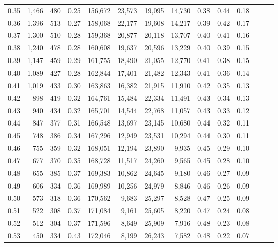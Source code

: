 \begin{tabular}{rrrrrrrrrrrrrr}
0.35 &  1,466 &  480 &  0.25 &  156,672 &   23,573 &  19,095 &  14,730 &  0.38 &  0.44 &      0.18 \\
0.36 &  1,396 &  513 &  0.27 &  158,068 &   22,177 &  19,608 &  14,217 &  0.39 &  0.42 &      0.17 \\
0.37 &  1,300 &  510 &  0.28 &  159,368 &   20,877 &  20,118 &  13,707 &  0.40 &  0.41 &      0.16 \\
0.38 &  1,240 &  478 &  0.28 &  160,608 &   19,637 &  20,596 &  13,229 &  0.40 &  0.39 &      0.15 \\
0.39 &  1,147 &  459 &  0.29 &  161,755 &   18,490 &  21,055 &  12,770 &  0.41 &  0.38 &      0.15 \\
0.40 &  1,089 &  427 &  0.28 &  162,844 &   17,401 &  21,482 &  12,343 &  0.41 &  0.36 &      0.14 \\
0.41 &  1,019 &  433 &  0.30 &  163,863 &   16,382 &  21,915 &  11,910 &  0.42 &  0.35 &      0.13 \\
0.42 &    898 &  419 &  0.32 &  164,761 &   15,484 &  22,334 &  11,491 &  0.43 &  0.34 &      0.13 \\
0.43 &    940 &  434 &  0.32 &  165,701 &   14,544 &  22,768 &  11,057 &  0.43 &  0.33 &      0.12 \\
0.44 &    847 &  377 &  0.31 &  166,548 &   13,697 &  23,145 &  10,680 &  0.44 &  0.32 &      0.11 \\
0.45 &    748 &  386 &  0.34 &  167,296 &   12,949 &  23,531 &  10,294 &  0.44 &  0.30 &      0.11 \\
0.46 &    755 &  359 &  0.32 &  168,051 &   12,194 &  23,890 &   9,935 &  0.45 &  0.29 &      0.10 \\
0.47 &    677 &  370 &  0.35 &  168,728 &   11,517 &  24,260 &   9,565 &  0.45 &  0.28 &      0.10 \\
0.48 &    655 &  385 &  0.37 &  169,383 &   10,862 &  24,645 &   9,180 &  0.46 &  0.27 &      0.09 \\
0.49 &    606 &  334 &  0.36 &  169,989 &   10,256 &  24,979 &   8,846 &  0.46 &  0.26 &      0.09 \\
0.50 &    573 &  318 &  0.36 &  170,562 &    9,683 &  25,297 &   8,528 &  0.47 &  0.25 &      0.09 \\
0.51 &    522 &  308 &  0.37 &  171,084 &    9,161 &  25,605 &   8,220 &  0.47 &  0.24 &      0.08 \\
0.52 &    512 &  304 &  0.37 &  171,596 &    8,649 &  25,909 &   7,916 &  0.48 &  0.23 &      0.08 \\
0.53 &    450 &  334 &  0.43 &  172,046 &    8,199 &  26,243 &   7,582 &  0.48 &  0.22 &      0.07 \\

\end{tabular}
